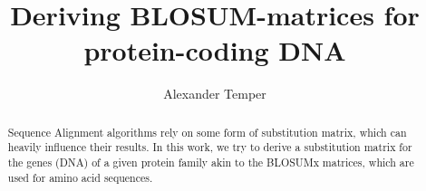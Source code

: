 \documentclass{article}
\title{Deriving BLOSUM-matrices for protein-coding DNA}
\author{Alexander Temper}
\begin{document}
\maketitle

\begin{abstract}
    Sequence Alignment algorithms rely on some form of substitution matrix, which
    can heavily influence their results. In this work, we try to derive a substitution matrix
    for the genes (DNA) of a given protein family akin to the BLOSUMx matrices, which are used
    for amino acid sequences.
\end{abstract}

\tableofcontents


\par
\end{document}
